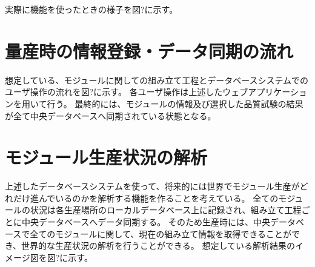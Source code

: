 実際に機能を使ったときの様子を図?に示す。


\section{量産時の情報登録・データ同期の流れ}
想定している、モジュールに関しての組み立て工程とデータベースシステムでのユーザ操作の流れを図?に示す。
各ユーザ操作は上述したウェブアプリケーションを用いて行う。
最終的には、モジュールの情報及び選択した品質試験の結果が全て中央データベースへ同期されている状態となる。

\section{モジュール生産状況の解析}
上述したデータベースシステムを使って、将来的には世界でモジュール生産がどれだけ進んでいるのかを解析する機能を作ることを考えている。
全てのモジュールの状況は各生産場所のローカルデータベース上に記録され、組み立て工程ごとに中央データベースへデータ同期する。
そのため生産時には、中央データベースで全てのモジュールに関して、現在の組み立て情報を取得できることができ、世界的な生産状況の解析を行うことができる。
想定している解析結果のイメージ図を図?に示す。
